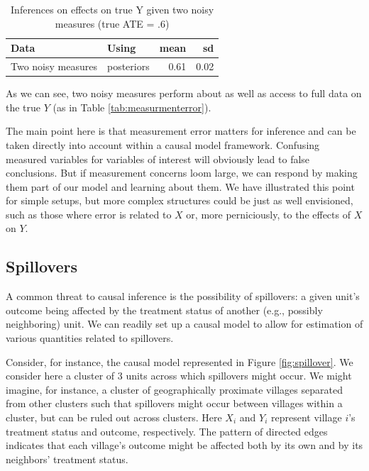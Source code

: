 \documentclass[
  12pt,
]{book}
\begin{document}
\begin{table}

\caption{\label{tab:measurementerror2}Inferences on effects on true Y given two noisy measures  (true ATE = .6)}
\centering
\begin{tabular}[t]{l|l|r|r}
\hline
Data & Using & mean & sd\\
\hline
Two noisy measures & posteriors & 0.61 & 0.02\\
\hline
\end{tabular}
\end{table}

As we can see, two noisy measures perform about as well as access to full data on the true \(Y\) (as in Table \ref{tab:measurmenterror}).

The main point here is that measurement error matters for inference and can be taken directly into account within a causal model framework. Confusing measured variables for variables of interest will obviously lead to false conclusions. But if measurement concerns loom large, we can respond by making them part of our model and learning about them. We have illustrated this point for simple setups, but more complex structures could be just as well envisioned, such as those where error is related to \(X\) or, more perniciously, to the effects of \(X\) on \(Y\).

\hypertarget{spillovers}{%
\subsection{Spillovers}\label{spillovers}}

A common threat to causal inference is the possibility of spillovers: a given unit's outcome being affected by the treatment status of another (e.g., possibly neighboring) unit. We can readily set up a causal model to allow for estimation of various quantities related to spillovers.

Consider, for instance, the causal model represented in Figure \ref{fig:spillover}. We consider here a cluster of 3 units across which spillovers might occur. We might imagine, for instance, a cluster of geographically proximate villages separated from other clusters such that spillovers might occur between villages within a cluster, but can be ruled out across clusters. Here \(X_i\) and \(Y_i\) represent village \(i\)'s treatment status and outcome, respectively. The pattern of directed edges indicates that each village's outcome might be affected both by its own and by its neighbors' treatment status.
\end{document}
